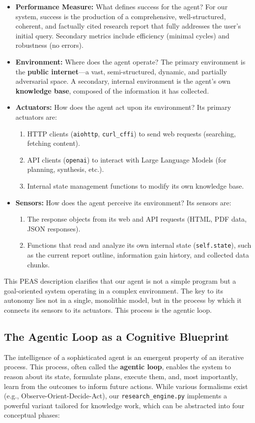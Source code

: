 \documentclass[12pt, a4paper]{article}
\begin{document}
\begin{itemize}
    \item \textbf{Performance Measure:} What defines success for the agent? For our system, success is the production of a comprehensive, well-structured, coherent, and factually cited research report that fully addresses the user's initial query. Secondary metrics include efficiency (minimal cycles) and robustness (no errors).
    \item \textbf{Environment:} Where does the agent operate? The primary environment is the \textbf{public internet}—a vast, semi-structured, dynamic, and partially adversarial space. A secondary, internal environment is the agent's own \textbf{knowledge base}, composed of the information it has collected.
    \item \textbf{Actuators:} How does the agent act upon its environment? Its primary actuators are:
    \begin{enumerate}
        \item HTTP clients (\verb|aiohttp|, \verb|curl_cffi|) to send web requests (searching, fetching content).
        \item API clients (\verb|openai|) to interact with Large Language Models (for planning, synthesis, etc.).
        \item Internal state management functions to modify its own knowledge base.
    \end{enumerate}
    \item \textbf{Sensors:} How does the agent perceive its environment? Its sensors are:
    \begin{enumerate}
        \item The response objects from its web and API requests (HTML, PDF data, JSON responses).
        \item Functions that read and analyze its own internal state (\verb|self.state|), such as the current report outline, information gain history, and collected data chunks.
    \end{enumerate}
\end{itemize}

This PEAS description clarifies that our agent is not a simple program but a goal-oriented system operating in a complex environment. The key to its autonomy lies not in a single, monolithic model, but in the process by which it connects its sensors to its actuators. This process is the agentic loop.

\subsection{The Agentic Loop as a Cognitive Blueprint}
The intelligence of a sophisticated agent is an emergent property of an iterative process. This process, often called the \textbf{agentic loop}, enables the system to reason about its state, formulate plans, execute them, and, most importantly, learn from the outcomes to inform future actions. While various formalisms exist (e.g., Observe-Orient-Decide-Act), our \verb|research_engine.py| implements a powerful variant tailored for knowledge work, which can be abstracted into four conceptual phases:
\end{document}
